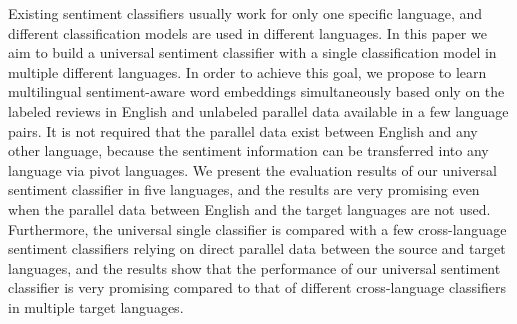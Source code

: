 Existing sentiment classifiers usually work for only one specific language, and different classification models are used in different languages. In this paper we aim to build a universal sentiment classifier with a single classification model in multiple different languages. In order to achieve this goal, we propose to learn multilingual sentiment-aware word embeddings simultaneously based only on the labeled reviews in English and unlabeled parallel data available in a few language pairs. It is not required that the parallel data exist between English and any other language, because the sentiment information can be transferred into any language via pivot languages. We present the evaluation results of our universal sentiment classifier in five languages, and the results are very promising even when the parallel data between English and the target languages are not used. Furthermore, the universal single classifier is compared with a few cross-language sentiment classifiers relying on direct parallel data between the source and target languages, and the results show that the performance of our universal sentiment classifier is very promising compared to that of different cross-language classifiers in multiple target languages.

